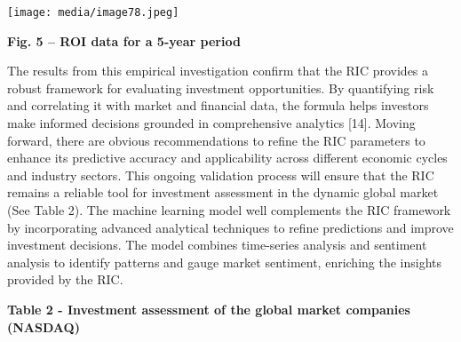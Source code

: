 \documentclass[
]{article}
\begin{document}
\texttt{[image: media/image78.jpeg]}

\textbf{Fig. 5 -- ROI data for a 5-year period}

The results from this empirical investigation confirm that the RIC
provides a robust framework for evaluating investment opportunities. By
quantifying risk and correlating it with market and financial data, the
formula helps investors make informed decisions grounded in
comprehensive analytics {[}14{]}. Moving forward, there are obvious
recommendations to refine the RIC parameters to enhance its predictive
accuracy and applicability across different economic cycles and industry
sectors. This ongoing validation process will ensure that the RIC
remains a reliable tool for investment assessment in the dynamic global
market (See Table 2). The machine learning model well complements the
RIC framework by incorporating advanced analytical techniques to refine
predictions and improve investment decisions. The model combines
time-series analysis and sentiment analysis to identify patterns and
gauge market sentiment, enriching the insights provided by the RIC.

\textbf{Table 2 - Investment assessment of the global market companies
(NASDAQ)}
\end{document}
